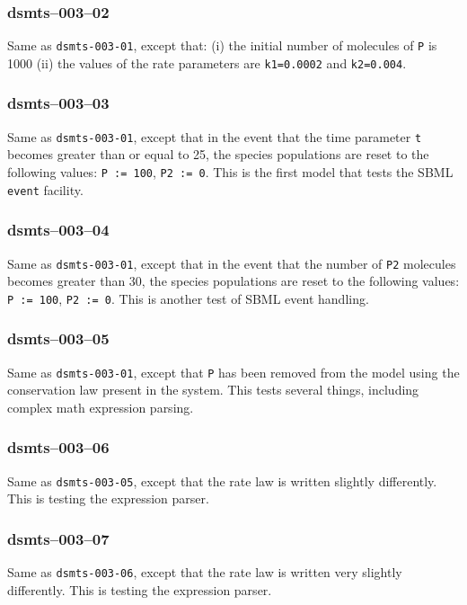 
\subsubsection{dsmts--003--02} 

Same as \verb$dsmts-003-01$, except that: (i) the initial number of
molecules of \verb$P$ is 1000 (ii) the values of the rate parameters
are \verb$k1=0.0002$ and \verb$k2=0.004$. 


\subsubsection{dsmts--003--03} 

Same as \verb$dsmts-003-01$, except that in the event that the time
parameter \verb$t$ becomes greater than or equal to 25, the species
populations are reset to the following values: \verb$P := 100$,
\verb$P2 := 0$. This is the first model that tests the SBML
\verb$event$ facility.


\subsubsection{dsmts--003--04} 

Same as \verb$dsmts-003-01$, except that in the event that the number
of \verb$P2$ molecules becomes greater than 30, the species
populations are reset to the following values: \verb$P := 100$, 
\verb$P2 := 0$. This is another test of SBML event
handling.


\subsubsection{dsmts--003--05} 

Same as \verb$dsmts-003-01$, except that \verb$P$ has been removed
from the model using the conservation law present in the system. This
tests several things, including complex math expression
parsing.


\subsubsection{dsmts--003--06} 

Same as \verb$dsmts-003-05$, except that the rate law is written
slightly differently. This is testing the expression
parser.


\subsubsection{dsmts--003--07} 

Same as \verb$dsmts-003-06$, except that the rate law is written very
slightly differently. This is testing the expression
parser.



